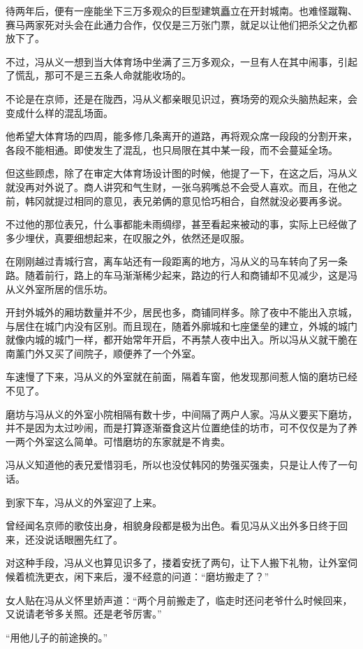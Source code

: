 待两年后，便有一座能坐下三万多观众的巨型建筑矗立在开封城南。也难怪蹴鞠、赛马两家死对头会在此通力合作，仅仅是三万张门票，就足以让他们把杀父之仇都放下了。

不过，冯从义一想到当大体育场中坐满了三万多观众，一旦有人在其中闹事，引起了慌乱，那可不是三五条人命就能收场的。

不论是在京师，还是在陇西，冯从义都亲眼见识过，赛场旁的观众头脑热起来，会变成什么样的混乱场面。

他希望大体育场的四周，能多修几条离开的道路，再将观众席一段段的分割开来，各段不能相通。即使发生了混乱，也只局限在其中某一段，而不会蔓延全场。

但这些顾虑，除了在审定大体育场设计图的时候，他提了一下，在这之后，冯从义就没再对外说了。商人讲究和气生财，一张乌鸦嘴总不会受人喜欢。而且，在他之前，韩冈就提过相同的意见，表兄弟俩的意见恰巧相合，自然就没必要再多说。

不过他的那位表兄，什么事都能未雨绸缪，甚至看起来被动的事，实际上已经做了多少埋伏，真要细想起来，在叹服之外，依然还是叹服。

在刚刚越过青城行宫，离车站还有一段距离的地方，冯从义的马车转向了另一条路。随着前行，路上的车马渐渐稀少起来，路边的行人和商铺却不见减少，这是冯从义外室所居的信乐坊。

开封外城外的厢坊数量并不少，居民也多，商铺同样多。除了夜中不能出入京城，与居住在城门内没有区别。而且现在，随着外廓城和七座堡垒的建立，外城的城门就像内城的城门一样，都开始常年开启，不再禁人夜中出入。所以冯从义就干脆在南薰门外又买了间院子，顺便养了一个外室。

车速慢了下来，冯从义的外室就在前面，隔着车窗，他发现那间惹人恼的磨坊已经不见了。

磨坊与冯从义的外室小院相隔有数十步，中间隔了两户人家。冯从义要买下磨坊，并不是因为太过吵闹，而是打算逐渐蚕食这片位置绝佳的坊市，可不仅仅是为了养一两个外室这么简单。可惜磨坊的东家就是不肯卖。

冯从义知道他的表兄爱惜羽毛，所以也没仗韩冈的势强买强卖，只是让人传了一句话。

到家下车，冯从义的外室迎了上来。

曾经闻名京师的歌伎出身，相貌身段都是极为出色。看见冯从义出外多日终于回来，还没说话眼圈先红了。

对这种手段，冯从义也算见识多了，搂着安抚了两句，让下人搬下礼物，让外室伺候着梳洗更衣，闲下来后，漫不经意的问道：“磨坊搬走了？”

女人贴在冯从义怀里娇声道：“两个月前搬走了，临走时还问老爷什么时候回来，又说请老爷多关照。还是老爷厉害。”

“用他儿子的前途换的。”

